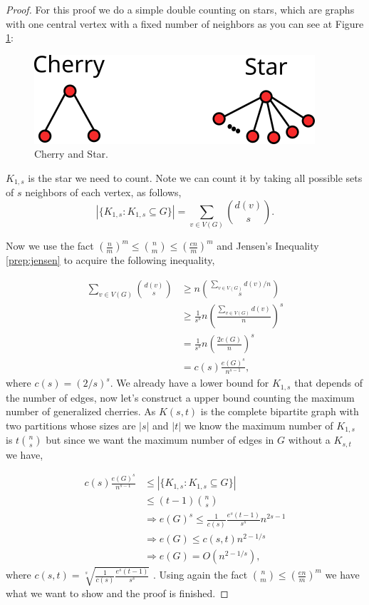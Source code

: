 \documentclass[12pt,twoside,a4paper,bibliography=totocnumbered]{book}
\numberwithin{equation}{section}
\theoremstyle{remark}
\begin{document}
\begin{proof}

For this proof we do a simple double counting on stars, which are graphs with one central vertex with a fixed number of neighbors as you can see at Figure \ref{fig:generalizedcherry}:

\begin{figure}[!htb]
     \centering
     \includegraphics[scale=1]{Figuras/cherry-and-star.png}
     \caption{Cherry and Star.}
     \label{fig:generalizedcherry}
\end{figure}

$K_{1,s}$ is the star we need to count. Note we can count it by taking all possible sets of $s$ neighbors of each vertex, as follows,
$$ |\{K_{1,s}\colon K_{1,s} \subseteq G\}| = \sum_{v \in V(G)} \binom{d(v)}{s} .$$

Now we use the fact $\left(\frac{n}{m}\right)^m \leq \binom{n}{m} \leq \left(\frac{en}{m}\right)^m$ and Jensen's Inequality \ref{prep:jensen} to acquire the following inequality,

\begin{align*} 
\sum_{v \in V(G)} \binom{d(v)}{s} & \geq n\binom{\sum_{v \in V(G)} d(v)/n}{s}\\ 
& \geq \frac{1}{s^s} n \left( \frac{\sum_{v \in V(G)} d(v)}{n} \right) ^s \\
& = \frac{1}{s^s} n \left( \frac{ 2 e(G)}{n} \right) ^s \\
& = c(s) \frac{e(G)^s}{n^{s-1}},
\end{align*}
where $c(s) = \left(2/s\right)^s$.
We already have a lower bound for $K_{1,s}$ that depends of the number of edges, now let's construct a upper bound counting the maximum number of generalized cherries.
As $K(s,t)$ is the complete bipartite graph with two partitions whose sizes are $|s|$ and $|t|$ we know the maximum number of $K_{1,s}$ is $t\binom{n}{s}$ but since we want the maximum number of edges in $G$ without a $K_{s,t}$ we have,

\begin{align*}
c(s) \frac{e(G)^s}{n^{s-1}} &\leq |\{K_{1,s}\colon K_{1,s} \subseteq G\}|\\
&\leq (t-1) \binom{n}{s}\\
		       & \Rightarrow e(G)^s \leq \frac{1}{c(s)}\frac{e^s(t-1)}{s^s}n^{2s-1}\\
		       &\Rightarrow e(G) \leq c(s,t) n^{2-1/s}\\
		       &\Rightarrow e(G) = O(n^{2-1/s}),
\end{align*}
where $c(s,t)= \sqrt[s]{\frac{1}{c(s)}\frac{e^s(t-1)}{s^s}}$ . Using again the fact $\binom{n}{m} \leq \left(\frac{en}{m}\right)^m$ we have what we want to show and the proof is finished.
\end{proof}
\end{document}
